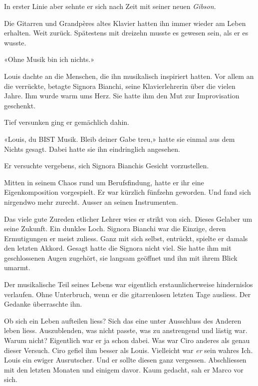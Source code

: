 In erster Linie aber sehnte er sich nach Zeit mit seiner neuen
\emph{Gibson.}

Die Gitarren und Grandpères altes Klavier hatten ihn immer wieder am
Leben erhalten. Weit zurück. Spätestens mit dreizehn musste es gewesen
sein, als er es wusste.

«Ohne Musik bin ich nichts.»

Louis dachte an die Menschen, die ihn musikalisch inspiriert hatten. Vor
allem an die verrückte, betagte Signora Bianchi, seine Klavierlehrerin
über die vielen Jahre. Ihm wurde warm ums Herz. Sie hatte ihm den Mut
zur Improvisation geschenkt.

Tief versunken ging er gemächlich dahin.

«Louis, du BIST Musik. Bleib deiner Gabe treu,» hatte sie einmal aus dem
Nichts gesagt. Dabei hatte sie ihn eindringlich angesehen.

Er versuchte vergebens, sich Signora Bianchis Gesicht vorzustellen.

Mitten in seinem Chaos rund um Berufsfindung, hatte er ihr eine
Eigenkomposition vorgespielt. Er war kürzlich fünfzehn geworden. Und
fand sich nirgendwo mehr zurecht. Ausser an seinen Instrumenten.

Das viele gute Zureden etlicher Lehrer wies er strikt von sich. Dieses
Gelaber um seine Zukunft. Ein dunkles Loch. Signora Bianchi war die
Einzige, deren Ermutigungen er meist zuliess. Ganz mit sich selbst,
entrückt, spielte er damals den letzten Akkord. Gesagt hatte die Signora
nicht viel. Sie hatte ihm mit geschlossenen Augen zugehört, sie langsam
geöffnet und ihn mit ihrem Blick umarmt.

Der musikalische Teil seines Lebens war eigentlich erstaunlicherweise
hindernislos verlaufen. Ohne Unterbruch, wenn er die gitarrenlosen
letzten Tage ausliess. Der Gedanke überraschte ihn.

Ob sich ein Leben aufteilen liess? Sich das eine unter Ausschluss des
Anderen leben liess. Auszublenden, was nicht passte, was zu anstrengend
und lästig war. Warum nicht? Eigentlich war er ja schon dabei. Was war
Ciro anderes als genau dieser Versuch. Ciro gefiel ihm besser als Louis.
Vielleicht war \emph{er} sein wahres Ich. Louis ein ewiger Ausrutscher.
Und er sollte diesen ganz vergessen. Abschliessen mit den letzten
Monaten und einigem davor. Kaum gedacht, sah er Marco vor sich.

